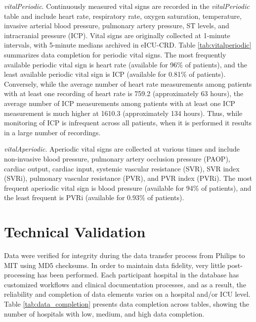 \documentclass[english]{article}
\newcommand{\tblname}[1]{\emph{#1}}
\begin{document}
\tblname{vitalPeriodic}. Continuously measured vital signs are recorded in the \tblname{vitalPeriodic} table
and include heart rate, respiratory rate,
oxygen saturation, temperature, invasive arterial blood pressure,
pulmonary artery pressure, ST levels, and intracranial pressure (ICP).
Vital signs are originally collected at 1-minute intervals, with 5-minute medians archived in eICU-CRD.
Table \ref{tab:vitalperiodic} summarizes data completion for periodic vital signs.
The most frequently available periodic vital sign is heart rate
(available for 96\% of patients), and the least available periodic vital
sign is ICP (available for 0.81\% of patients).
Conversely, while the average number of heart rate measurements among
patients with at least one recording of heart rate is 759.2 (approximately 63 hours),
the average number of ICP measurements among patients with at least one ICP measurement is much higher
at 1610.3 (approximately 134 hours). Thus, while monitoring of ICP is infrequent across all patients,
when it is performed it results in a large number of recordings.


\tblname{vitalAperiodic}. Aperiodic vital signs are collected at various times and include
non-invasive blood pressure, pulmonary artery occlusion pressure (PAOP),
cardiac output, cardiac input, systemic vascular resistance (SVR), SVR
index (SVRi), pulmonary vascular resistance (PVR), and PVR index (PVRi).
The most frequent aperiodic vital sign is blood pressure (available for
94\% of patients), and the least frequent is PVRi (available for 0.93\%
of patients).

\section*{Technical Validation}\label{technical-validation}


Data were verified for integrity during the data transfer process from
Philips to MIT using MD5 checksums.
In order to maintain data fidelity, very little post-processing has been performed.
Each participant hospital in the database has customized
workflows and clinical documentation processes, and as a result, the
reliability and completion of data elements varies on a hospital and/or
ICU level.
Table \ref{tab:data_completion} presents data completion across tables, showing the number of hospitals with low, medium, and high data completion.
\end{document}
